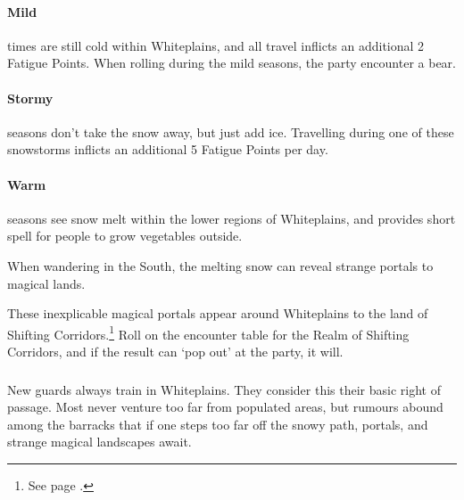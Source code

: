\begin{multicols}{2}
{\paragraph{Mild} times are still cold within Whiteplains, and all travel inflicts an additional 2 Fatigue Points.
When rolling during the mild seasons, the party encounter a bear.
\paragraph{Stormy} seasons don't take the snow away, but just add ice.
Travelling during one of these snowstorms inflicts an additional 5 Fatigue Points per day.
\paragraph{Warm} seasons see snow melt within the lower regions of Whiteplains, and provides short spell for people to grow vegetables outside.

When wandering in the South, the melting snow can reveal strange portals to magical lands.

These inexplicable magical portals appear around Whiteplains to the land of Shifting Corridors.\footnote{See page \pageref{shiftingcorridors}.}
Roll on the encounter table for the Realm of Shifting Corridors, and if the result can `pop out' at the party, it will.
}

\subsubsection{}

New guards always train in Whiteplains.
They consider this their basic right of passage.
Most never venture too far from populated areas, but rumours abound among the barracks that if one steps too far off the snowy path, portals, and strange magical landscapes await.

\end{multicols}

\vfill\null
